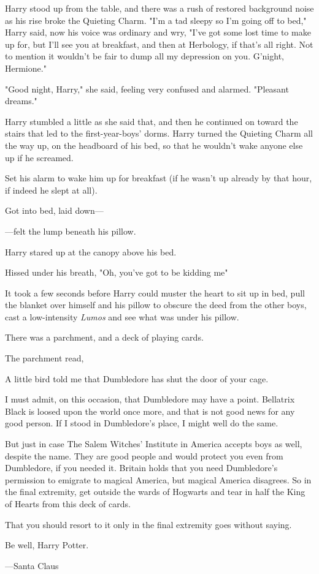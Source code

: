 Harry stood up from the table, and there was a rush of restored background
noise as his rise broke the Quieting Charm. "I'm a tad sleepy so I'm going off
to bed," Harry said, now his voice was ordinary and wry, "I've got some lost
time to make up for, but I'll see you at breakfast, and then at Herbology, if
that's all right. Not to mention it wouldn't be fair to dump all my depression
on you. G'night, Hermione."

"Good night, Harry," she said, feeling very confused and alarmed. "Pleasant
dreams."

Harry stumbled a little as she said that, and then he continued on toward the
stairs that led to the first-year-boys' dorms.
\sbreak
Harry turned the Quieting Charm all the way up, on the headboard of his bed, so
that he wouldn't wake anyone else up if he screamed.

Set his alarm to wake him up for breakfast (if he wasn't up already by that
hour, if indeed he slept at all).

Got into bed, laid down—

—felt the lump beneath his pillow.

Harry stared up at the canopy above his bed.

Hissed under his breath, "Oh, you've got to be kidding me{\el}"

It took a few seconds before Harry could muster the heart to sit up in bed,
pull the blanket over himself and his pillow to obscure the deed from the other
boys, cast a low-intensity \emph{Lumos} and see what was under his pillow.

There was a parchment, and a deck of playing cards.

The parchment read,

\begin{writtenNote}
A little bird told me that Dumbledore has shut the door of your cage.

I must admit, on this occasion, that Dumbledore may have a point.
Bellatrix Black is loosed upon the world once more, and that is not good news
for any good person. If I stood in Dumbledore's place, I might well do the
same.

But just in case{\el} The Salem Witches' Institute in America accepts
boys as well, despite the name. They are good people and would protect you even
from Dumbledore, if you needed it. Britain holds that you need Dumbledore's
permission to emigrate to magical America, but magical America disagrees. So in
the final extremity, get outside the wards of Hogwarts and tear in half the
King of Hearts from this deck of cards.

That you should resort to it only in the final extremity goes without
saying.

Be well, Harry Potter.

—Santa Claus
\end{writtenNote}

